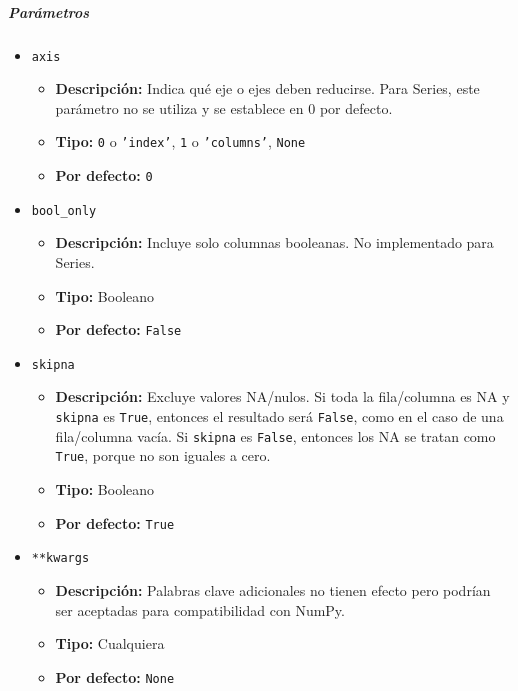 \subparagraph{\textbf{Parámetros}}
\begin{itemize}
    \item \texttt{axis}
          \begin{itemize}
              \item \textbf{Descripción:} Indica qué eje o ejes deben
                    reducirse. Para Series, este parámetro no se utiliza y se establece en 0 por
                    defecto.
              \item \textbf{Tipo:} \texttt{0} o \texttt{'index'}, \texttt{1} o
                    \texttt{'columns'}, \texttt{None}
              \item \textbf{Por defecto:} \texttt{0}
          \end{itemize}
    \item \texttt{bool\_only}
          \begin{itemize}
              \item \textbf{Descripción:} Incluye solo columnas booleanas. No
                    implementado para Series.
              \item \textbf{Tipo:} Booleano
              \item \textbf{Por defecto:} \texttt{False}
          \end{itemize}
    \item \texttt{skipna}
          \begin{itemize}
              \item \textbf{Descripción:} Excluye valores NA/nulos. Si toda la
                    fila/columna es NA y \texttt{skipna} es \texttt{True}, entonces el resultado
                    será \texttt{False}, como en el caso de una fila/columna vacía. Si
                    \texttt{skipna} es \texttt{False}, entonces los NA se tratan como
                    \texttt{True}, porque no son iguales a cero.
              \item \textbf{Tipo:} Booleano
              \item \textbf{Por defecto:} \texttt{True}
          \end{itemize}
    \item \texttt{**kwargs}
          \begin{itemize}
              \item \textbf{Descripción:} Palabras clave adicionales no tienen
                    efecto pero podrían ser aceptadas para compatibilidad con NumPy.
              \item \textbf{Tipo:} Cualquiera
              \item \textbf{Por defecto:} \texttt{None}
          \end{itemize}
\end{itemize}

